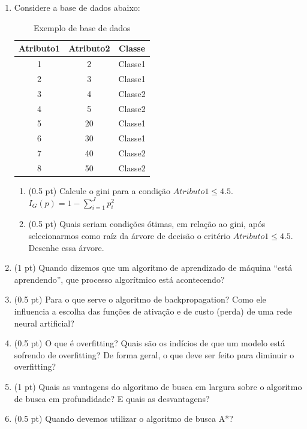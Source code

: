 \documentclass{article}
\begin{document}
\begin{enumerate}
\item Considere a base de dados abaixo:

\begin{table}[h!]
    \footnotesize
    \centering
    \begin{tabular}{|c|c|c|}
    \hline
    \textbf{Atributo1} & \textbf{Atributo2} & \textbf{Classe} \\
    \hline
    1 & 2 & Classe1 \\
    2 & 3 & Classe1 \\
    3 & 4 & Classe2 \\
    4 & 5 & Classe2 \\
    5 & 20 & Classe1 \\
    6 & 30 & Classe1 \\
    7 & 40 & Classe2 \\
    8 & 50 & Classe2 \\
    \hline
    \end{tabular}
    \caption{Exemplo de base de dados}
    \label{tab:exemplo}
\end{table}

\begin{enumerate}
    \item (0.5 pt) Calcule o gini para a condição $Atributo1 \leq 4.5$. $I_{G}(p) = 1 - \sum_{i=1}^{J} p_{i}^{2}$
    \item (0.5 pt) Quais seriam condições ótimas, em relação ao gini, após selecionarmos como raíz da árvore de decisão o critério $Atributo1 \leq 4.5$. Desenhe essa árvore.
\end{enumerate}

\item (1 pt) Quando dizemos que um algoritmo de aprendizado de máquina ``está aprendendo'', que processo algorítmico está acontecendo?

\item (0.5 pt) Para o que serve o algoritmo de backpropagation? Como ele influencia a escolha das funções de ativação e de custo (perda) de uma rede neural artificial?

\item (0.5 pt) O que é overfitting? Quais são os indícios de que um modelo está sofrendo de overfitting? De forma geral, o que deve ser feito para diminuir o overfitting?

\item (1 pt) Quais as vantagens do algoritmo de busca em largura sobre o algoritmo de busca em profundidade? E quais as desvantagens?

\item (0.5 pt)  Quando devemos utilizar o algoritmo de busca A*?

\end{enumerate}
\end{document}
